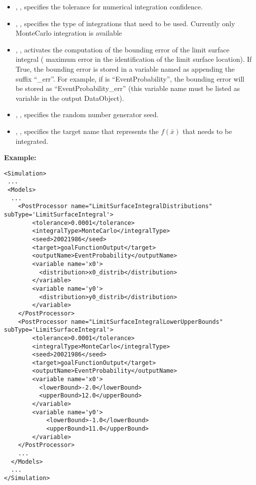 \begin{itemize}
    \item  {}, , specifies the tolerance for
               numerical integration confidence.
     \item  {}, , specifies the type of integrations that
                need to be used. Currently only MonteCarlo integration is available
    \item  {}, ,
    activates the computation of the bounding error of the limit
    surface integral ( maximum error in the identification of the
    limit surface location). If True, the bounding error is stored
    in a variable named as  appending the suffix
    ``\_err''. For example, if  is
    ``EventProbability'', the bounding error will be stored as
    ``EventProbability\_err'' (this variable name must be listed as
    variable in the output DataObject).
     \item  {}, , specifies the random number generator seed.
     \item  {}, , specifies the target name that represents
                the $f\left ( \bar{x} \right )$ that needs to be integrated.
\end{itemize}

\textbf{Example:}
\begin{lstlisting}[style=XML,morekeywords={name,subType,debug,class,type}]
<Simulation>
 ...
 <Models>
  ...
    <PostProcessor name="LimitSurfaceIntegralDistributions" subType='LimitSurfaceIntegral'>
        <tolerance>0.0001</tolerance>
        <integralType>MonteCarlo</integralType>
        <seed>20021986</seed>
        <target>goalFunctionOutput</target>
        <outputName>EventProbability</outputName>
        <variable name='x0'>
          <distribution>x0_distrib</distribution>
        </variable>
        <variable name='y0'>
          <distribution>y0_distrib</distribution>
        </variable>
    </PostProcessor>
    <PostProcessor name="LimitSurfaceIntegralLowerUpperBounds" subType='LimitSurfaceIntegral'>
        <tolerance>0.0001</tolerance>
        <integralType>MonteCarlo</integralType>
        <seed>20021986</seed>
        <target>goalFunctionOutput</target>
        <outputName>EventProbability</outputName>
        <variable name='x0'>
          <lowerBound>-2.0</lowerBound>
          <upperBound>12.0</upperBound>
        </variable>
        <variable name='y0'>
            <lowerBound>-1.0</lowerBound>
            <upperBound>11.0</upperBound>
        </variable>
    </PostProcessor>
    ...
  </Models>
  ...
</Simulation>
\end{lstlisting}



